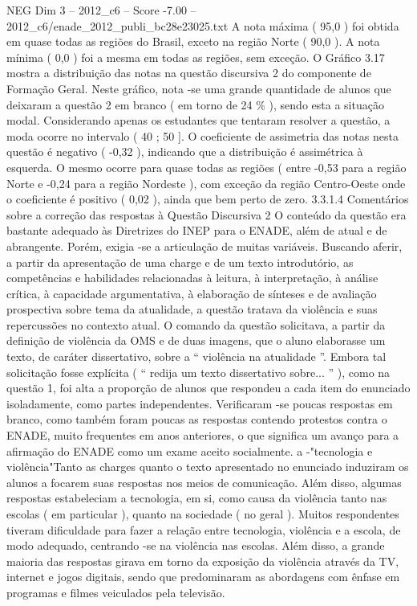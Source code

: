 \begin{textsample}{NEG Dim 3 – 2012\_c6 – Score -7.00 – 2012\_c6/enade\_2012\_publi\_bc28e23025.txt}
A nota máxima ( 95,0 ) foi obtida em quase todas as regiões do Brasil, exceto na região Norte ( 90,0 ).
A nota mínima ( 0,0 ) foi a mesma em todas as regiões, sem exceção.
O Gráfico 3.17 mostra a distribuição das notas na questão discursiva 2 do componente de Formação Geral.
Neste gráfico, nota -se uma grande quantidade de alunos que deixaram a questão 2 em branco ( em torno de 24 \% ), sendo esta a situação modal.
Considerando apenas os estudantes que tentaram resolver a questão, a moda ocorre no intervalo ( 40 ; 50 ].
O coeficiente de assimetria das notas nesta questão é negativo ( -0,32 ), indicando que a distribuição é assimétrica à esquerda.
O mesmo ocorre para quase todas as regiões ( entre -0,53 para a região Norte e -0,24 para a região Nordeste ), com exceção da região Centro-Oeste onde o coeficiente é positivo ( 0,02 ), ainda que bem perto de zero. 3.3.1.4 Comentários sobre a correção das respostas à Questão Discursiva 2 O conteúdo da questão era bastante adequado às Diretrizes do INEP para o ENADE, além de atual e de abrangente.
Porém, exigia -se a articulação de muitas variáveis.
Buscando aferir, a partir da apresentação de uma charge e de um texto introdutório, as competências e habilidades relacionadas à leitura, à interpretação, à análise crítica, à capacidade argumentativa, à elaboração de sínteses e de avaliação prospectiva sobre tema da atualidade, a questão tratava da violência e suas repercussões no contexto atual.
O comando da questão solicitava, a partir da definição de violência da OMS e de duas imagens, que o aluno elaborasse um texto, de caráter dissertativo, sobre a “ violência na atualidade ”.
Embora tal solicitação fosse explícita ( “ redija um texto dissertativo sobre... ” ), como na questão 1, foi alta a proporção de alunos que respondeu a cada item do enunciado isoladamente, como partes independentes.
Verificaram -se poucas respostas em branco, como também foram poucas as respostas contendo protestos contra o ENADE, muito frequentes em anos anteriores, o que significa um avanço para a afirmação do ENADE como um exame aceito socialmente. a -"tecnologia e violência"Tanto as charges quanto o texto apresentado no enunciado induziram os alunos a focarem suas respostas nos meios de comunicação.
Além disso, algumas respostas estabeleciam a tecnologia, em si, como causa da violência tanto nas escolas ( em particular ), quanto na sociedade ( no geral ).
Muitos respondentes tiveram dificuldade para fazer a relação entre tecnologia, violência e a escola, de modo adequado, centrando -se na violência nas escolas.
Além disso, a grande maioria das respostas girava em torno da exposição da violência através da TV, internet e jogos digitais, sendo que predominaram as abordagens com ênfase em programas e filmes veiculados pela televisão.

\end{textsample}
